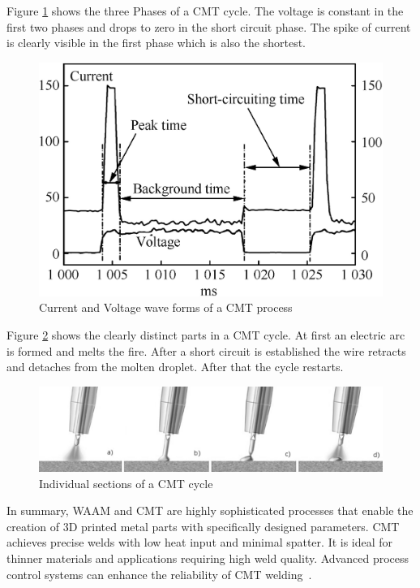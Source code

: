 Figure \ref{fig:CMT} shows the three Phases of a CMT cycle. The voltage is constant in the first two phases and drops to zero in the short circuit phase. The spike of current is clearly visible in the first phase which is also the shortest.

\begin{figure}[H]
	\centering
	\includegraphics[width=0.6\linewidth]{figures/CMT.jpg}
	\caption{Current and Voltage wave forms of a CMT process~\cite{Selvi.2018}}
	\label{fig:CMT}
\end{figure}


Figure \ref{fig:CMT2} shows the clearly distinct parts in a CMT cycle. At first an electric arc is formed and melts the fire. After a short circuit is established the wire retracts and detaches from the molten droplet. After that the cycle restarts.

\begin{figure}[H]
	\centering
	\includegraphics[width=0.9\linewidth]{figures/CMT2.png}
	\caption{Individual sections of a CMT cycle}
	\label{fig:CMT2}
\end{figure}


In summary, WAAM and CMT are highly sophisticated processes that enable the creation of 3D printed metal parts with specifically designed parameters. CMT achieves precise welds with low heat input and minimal spatter. It is ideal for thinner materials and applications requiring high weld quality. Advanced process control systems can enhance the reliability of CMT welding~\cite{Rahul.2018, Pickin.2011}.




